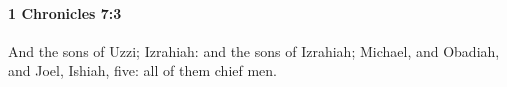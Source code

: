 
		\paragraph{1 Chronicles 7:3} %
			\label{1CHRONICLES-7-3}

			And the sons of Uzzi; Izrahiah: and the sons of Izrahiah; Michael, and Obadiah, and Joel, Ishiah, five: all of them chief men.



